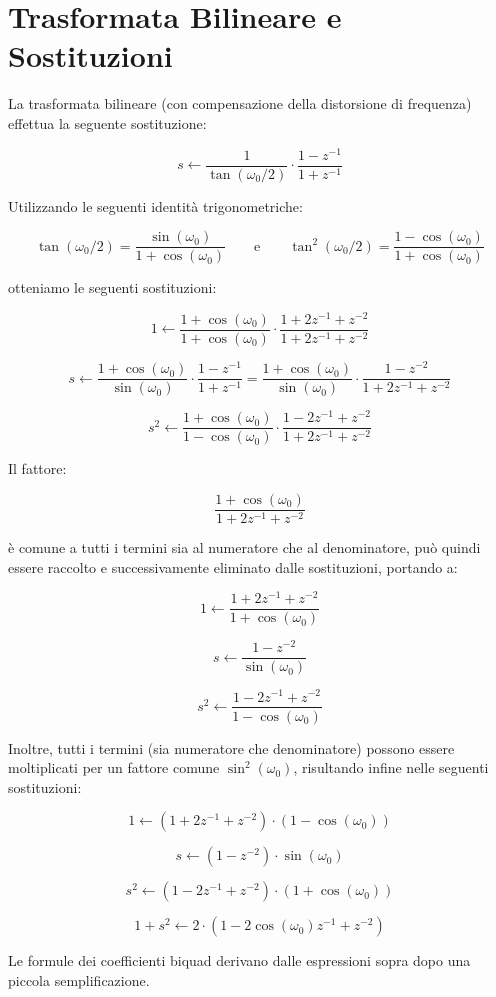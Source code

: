 \section*{Trasformata Bilineare e Sostituzioni}

La trasformata bilineare (con compensazione della distorsione di frequenza) effettua la seguente sostituzione:

\[
s \leftarrow \frac{1}{\tan(\omega_0/2)} \cdot \frac{1 - z^{-1}}{1 + z^{-1}}
\]

Utilizzando le seguenti identità trigonometriche:

\[
\tan(\omega_0/2) = \frac{\sin(\omega_0)}{1 + \cos(\omega_0)} \qquad \text{e} \qquad \tan^2(\omega_0/2) = \frac{1 - \cos(\omega_0)}{1 + \cos(\omega_0)}
\]

otteniamo le seguenti sostituzioni:

\[
1 \leftarrow \frac{1 + \cos(\omega_0)}{1 + \cos(\omega_0)} \cdot \frac{1 + 2z^{-1} + z^{-2}}{1 + 2z^{-1} + z^{-2}}
\]

\[
s \leftarrow \frac{1 + \cos(\omega_0)}{\sin(\omega_0)} \cdot \frac{1 - z^{-1}}{1 + z^{-1}} = \frac{1 + \cos(\omega_0)}{\sin(\omega_0)} \cdot \frac{1 - z^{-2}}{1 + 2z^{-1} + z^{-2}}
\]

\[
s^2 \leftarrow \frac{1 + \cos(\omega_0)}{1 - \cos(\omega_0)} \cdot \frac{1 - 2z^{-1} + z^{-2}}{1 + 2z^{-1} + z^{-2}}
\]

Il fattore:

\[
\frac{1 + \cos(\omega_0)}{1 + 2z^{-1} + z^{-2}}
\]

è comune a tutti i termini sia al numeratore che al denominatore, può quindi essere raccolto e successivamente eliminato dalle sostituzioni, portando a:

\[
1 \leftarrow \frac{1 + 2z^{-1} + z^{-2}}{1 + \cos(\omega_0)}
\]

\[
s \leftarrow \frac{1 - z^{-2}}{\sin(\omega_0)}
\]

\[
s^2 \leftarrow \frac{1 - 2z^{-1} + z^{-2}}{1 - \cos(\omega_0)}
\]

Inoltre, tutti i termini (sia numeratore che denominatore) possono essere moltiplicati per un fattore comune $\sin^2(\omega_0)$, risultando infine nelle seguenti sostituzioni:

\[
1 \leftarrow (1 + 2z^{-1} + z^{-2}) \cdot (1 - \cos(\omega_0))
\]

\[
s \leftarrow (1 - z^{-2}) \cdot \sin(\omega_0)
\]

\[
s^2 \leftarrow (1 - 2z^{-1} + z^{-2}) \cdot (1 + \cos(\omega_0))
\]

\[
1 + s^2 \leftarrow 2 \cdot (1 - 2\cos(\omega_0)z^{-1} + z^{-2})
\]

Le formule dei coefficienti biquad derivano dalle espressioni sopra dopo una piccola semplificazione.


